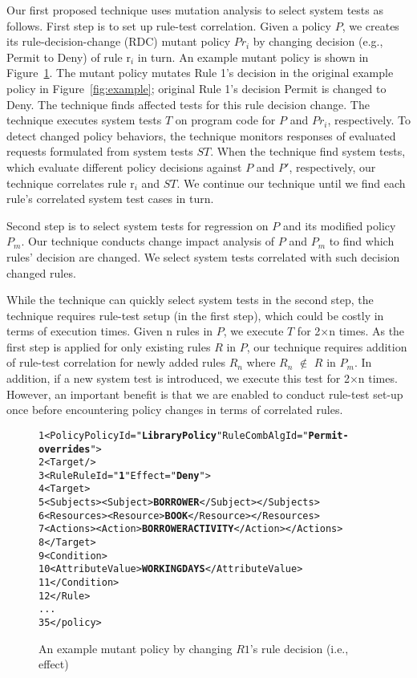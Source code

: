 Our first proposed technique uses mutation analysis to select system tests as follows.
First step is to set up rule-test correlation.
Given a policy $P$, we creates its rule-decision-change (RDC) mutant policy $Pr_i$ by changing decision (e.g., Permit to Deny) of rule r$_i$ in turn. An example mutant policy is shown in Figure~\ref{fig:rdcexample}. The mutant policy mutates Rule 1's decision in the original example policy in Figure~\ref{fig:example}; original Rule 1's decision Permit is changed to Deny. The technique finds affected tests for this rule decision change. 
The technique executes system tests $T$ on program code for $P$ and $Pr_i$, respectively. To detect changed policy behaviors, the technique monitors responses of evaluated requests formulated from system tests $ST$. When the technique find system tests, which evaluate different policy decisions against $P$ and $P'$, respectively, our technique 
correlates rule r$_i$ and $ST$.
We continue our technique until we find each rule's correlated system test cases in turn.

Second step is to select system tests for regression on $P$ and its modified policy $P_m$.
Our technique conducts change impact analysis of $P$ and $P_m$ to find which rules' decision are changed.
We select system tests correlated with such decision changed rules.

While the technique can quickly select system tests in the second step, the technique requires rule-test setup (in the first step), which could be costly in terms of execution times. Given n rules in $P$, we execute $T$ for 2$\times$n times. 
As the first step is applied for only existing rules $R$ in $P$, our technique requires addition of rule-test
correlation for newly added rules $R_n$ where $R_n$ $\notin$ $R$ in $P_m$. 
In addition, if a new system test is introduced, we execute this test for 2$\times$n times.
However, an important benefit is that we are enabled to conduct rule-test set-up once before encountering policy changes in terms of correlated rules. 

\begin{figure}[t]%
\begin{CodeOut}
\begin{alltt}
 1 <Policy PolicyId="\textbf{Library Policy}" RuleCombAlgId="\textbf{Permit-overrides}">
 2  <Target/>
 3    <Rule RuleId="\textbf{1}" Effect="\textbf{Deny}">
 4      <Target>
 5        <Subjects><Subject> \textbf{BORROWER} </Subject></Subjects>
 6        <Resources><Resource> \textbf{BOOK} </Resource></Resources>
 7        <Actions><Action> \textbf{BORROWERACTIVITY} </Action></Actions>
 8      </Target>
 9	    <Condition>
10        <AttributeValue> \textbf{WORKINGDAYS} </AttributeValue>
11      </Condition>
12    </Rule>
...
35 </policy>
\end{alltt}
\end{CodeOut}
\vspace*{-3.0ex} \caption{An example mutant policy by changing $R1$'s rule decision (i.e., effect)}
 \label{fig:rdcexample}
\end{figure}

